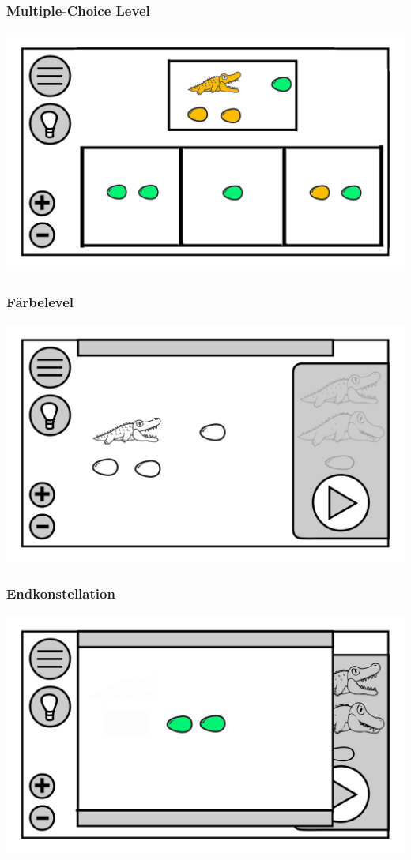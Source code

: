 \documentclass[t]{beamer}
\begin{document}
\begin{frame}
	\frametitle{Multiple-Choice Level}
	\includegraphics[height=\textheight]{level_choice.png}
\end{frame}
\begin{frame}
	\frametitle{Färbelevel}
	\includegraphics[height=\textheight]{level_white.png}
\end{frame}
\begin{frame}
	\frametitle{Endkonstellation}
	\includegraphics[height=\textheight]{level_end.png}
\end{frame}
\end{document}
